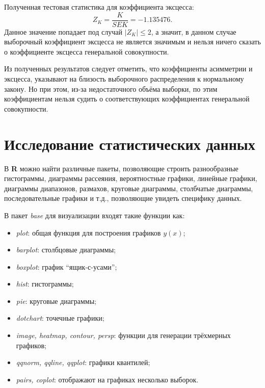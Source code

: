Полученная тестовая статистика для коэффициента эксцесса:
\begin{equation*}
	Z_K = \frac{K}{SEK} = -1.135476.
\end{equation*}
Данное значение попадает под случай $\vert Z_K \vert \le 2$, а значит, в данном случае выборочный коэффициент эксцесса не является значимым и нельзя ничего сказать о коэффициенте эксцесса генеральной совокупности.

Из полученных результатов следует отметить, что коэффициенты асимметрии и эксцесса, указывают на близость выборочного распределения к нормальному закону. Но при этом, из-за недостаточного объёма выборки, по этим коэффициентам нельзя судить о соответствующих коэффициентах генеральной совокупности.


\section{Исследование статистических данных} %
\label{sec:analysis}

В \textbf{R} можно найти различные пакеты, позволяющие строить разнообразные гистограммы, диаграммы рассеяния, вероятностные графики, линейные графики, диаграммы диапазонов, размахов, круговые диаграммы, столбчатые диаграммы, последовательные графики и т.д., позволяющие увидеть специфику данных.

В пакет \textit{base} для визуализации входят такие функции как:
\begin{itemize}
	\item \textit{plot}: общая функция для построения графиков $y(x)$;
	\item \textit{barplot}: столбцовые диаграммы;
	\item \textit{boxplot}: график ``ящик-с-усами'';
	\item \textit{hist}: гистограммы;
	\item \textit{pie}: круговые диаграммы;
	\item \textit{dotchart}: точечные графики;
	\item \textit{image, heatmap, contour, persp}: функции для генерации трёхмерных графиков;
	\item \textit{qqnorm, qqline, qqplot}: графики квантилей;
	\item \textit{pairs, coplot}: отображают на графиках несколько выборок.
\end{itemize}

